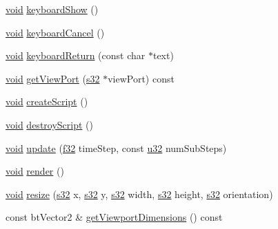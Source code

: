 \begin{DoxyCompactItemize}
\mbox{\hyperlink{_thread_8h_af1e856da2e658414cb2456cb6f7ebc66}{void}} \mbox{\hyperlink{classnjli_1_1_world_abd97ee22f8fbfa29ace0f4859b16d6e0}{keyboard\+Show}} ()
\item 
\mbox{\hyperlink{_thread_8h_af1e856da2e658414cb2456cb6f7ebc66}{void}} \mbox{\hyperlink{classnjli_1_1_world_a5ecc9ab5fe1c940ae021489d5574edf7}{keyboard\+Cancel}} ()
\item 
\mbox{\hyperlink{_thread_8h_af1e856da2e658414cb2456cb6f7ebc66}{void}} \mbox{\hyperlink{classnjli_1_1_world_a6e7f30cb39fb2cc23148a3765d0fed3e}{keyboard\+Return}} (const char $\ast$text)
\item 
\mbox{\hyperlink{_thread_8h_af1e856da2e658414cb2456cb6f7ebc66}{void}} \mbox{\hyperlink{classnjli_1_1_world_ab816a3e089fafc8fe7723723fb201bee}{get\+View\+Port}} (\mbox{\hyperlink{_util_8h_aa62c75d314a0d1f37f79c4b73b2292e2}{s32}} $\ast$view\+Port) const
\item 
\mbox{\hyperlink{_thread_8h_af1e856da2e658414cb2456cb6f7ebc66}{void}} \mbox{\hyperlink{classnjli_1_1_world_a32797f128d963f99839c12faf4b4dc12}{create\+Script}} ()
\item 
\mbox{\hyperlink{_thread_8h_af1e856da2e658414cb2456cb6f7ebc66}{void}} \mbox{\hyperlink{classnjli_1_1_world_ad27af4cf142639c3436f4163d0526442}{destroy\+Script}} ()
\item 
\mbox{\hyperlink{_thread_8h_af1e856da2e658414cb2456cb6f7ebc66}{void}} \mbox{\hyperlink{classnjli_1_1_world_a248c324a0a97b0f286eaedf8f997688e}{update}} (\mbox{\hyperlink{_util_8h_a5f6906312a689f27d70e9d086649d3fd}{f32}} time\+Step, const \mbox{\hyperlink{_util_8h_a10e94b422ef0c20dcdec20d31a1f5049}{u32}} num\+Sub\+Steps)
\item 
\mbox{\hyperlink{_thread_8h_af1e856da2e658414cb2456cb6f7ebc66}{void}} \mbox{\hyperlink{classnjli_1_1_world_a3e7f68f7467d421971e13dfcc5e2100e}{render}} ()
\item 
\mbox{\hyperlink{_thread_8h_af1e856da2e658414cb2456cb6f7ebc66}{void}} \mbox{\hyperlink{classnjli_1_1_world_a04acd6d056b32f996c165d2d9a8ee34d}{resize}} (\mbox{\hyperlink{_util_8h_aa62c75d314a0d1f37f79c4b73b2292e2}{s32}} x, \mbox{\hyperlink{_util_8h_aa62c75d314a0d1f37f79c4b73b2292e2}{s32}} y, \mbox{\hyperlink{_util_8h_aa62c75d314a0d1f37f79c4b73b2292e2}{s32}} width, \mbox{\hyperlink{_util_8h_aa62c75d314a0d1f37f79c4b73b2292e2}{s32}} height, \mbox{\hyperlink{_util_8h_aa62c75d314a0d1f37f79c4b73b2292e2}{s32}} orientation)
\item 
const bt\+Vector2 \& \mbox{\hyperlink{classnjli_1_1_world_a0d888d6664fed006bde6e9fd806bc41c}{get\+Viewport\+Dimensions}} () const

\end{DoxyCompactItemize}
